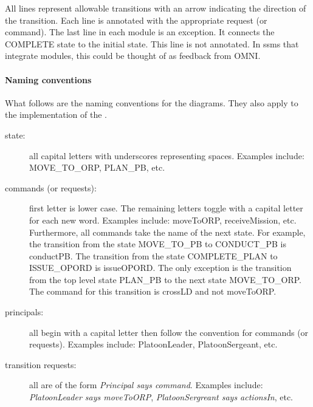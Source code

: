 \documentclass[../../main/main.tex]{subfiles}
\begin{document}
All lines represent allowable transitions with an arrow indicating the direction of the transition.  Each line is annotated with the appropriate  request (or command).  The last line in each module is an exception.  It connects the COMPLETE state to the initial state.  This line is not annotated. In \gls{ssm}s that integrate modules, this could be thought of as feedback from OMNI.


\paragraph*{Naming conventions}
What follows are the naming conventions for the diagrams.  They also apply to the  implementation of the .
\begin{description}
\item[state: ] all capital letters with underscores representing spaces.  Examples include: MOVE_TO_ORP, PLAN_PB, etc.
\item[commands (or requests):] first letter is lower case.  The remaining letters toggle with a capital letter for each new word.  Examples include: moveToORP,  receiveMission, etc.  Furthermore, all commands take the name of the next state. For example, the transition from the state MOVE_TO_PB to CONDUCT_PB is conductPB.  The transition from the state COMPLETE_PLAN to ISSUE_OPORD is issueOPORD.  The only exception is the transition from the top level state PLAN_PB to the next state MOVE_TO_ORP.  The command for this transition is crossLD and not moveToORP.
\item[principals:] all begin with a capital letter then follow the convention for commands (or requests).  Examples include: PlatoonLeader, PlatoonSergeant, etc.
\item [ transition requests:] all are of the form \textit{Principal says command}.  Examples include: \textit{PlatoonLeader says moveToORP}, \textit{PlatoonSergreant says actionsIn}, etc.
\end{description}
\end{document}
